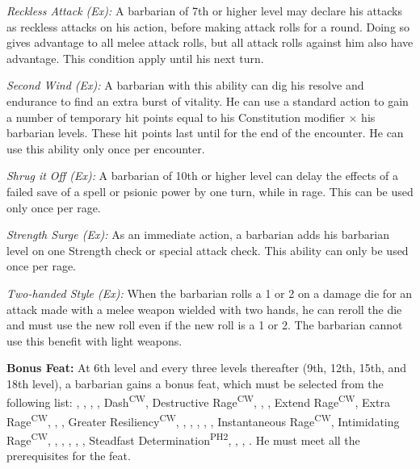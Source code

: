 \textit{Reckless Attack (Ex):} A barbarian of 7th or higher level may declare his attacks as reckless attacks on his action, before making attack rolls for a round. Doing so gives advantage to all melee attack rolls, but all attack rolls against him also have advantage. This condition apply until his next turn.

\textit{Second Wind (Ex):} A barbarian with this ability can dig his resolve and endurance to find an extra burst of vitality. He can use a standard action to gain a number of temporary hit points equal to his Constitution modifier $\times$ his barbarian levels. These hit points last until for the end of the encounter. He can use this ability only once per encounter.

\textit{Shrug it Off (Ex):} A barbarian of 10th or higher level can delay the effects of a failed save of a spell or psionic power by one turn, while in rage. This can be used only once per rage.

\textit{Strength Surge (Ex):} As an immediate action, a barbarian adds his barbarian level on one Strength check or special attack check. This ability can only be used once per rage.

\textit{Two-handed Style (Ex):} When the barbarian rolls a 1 or 2 on a damage die for an attack made with a melee weapon wielded with two hands, he can reroll the die and must use the new roll even if the new roll is a 1 or 2. The barbarian cannot use this benefit with light weapons.



\textbf{Bonus Feat:} At 6th level and every three levels thereafter (9th, 12th, 15th, and 18th level), a barbarian gains a bonus feat, which must be selected from the following list:
,
,
,
,
Dash\textsuperscript{CW},
Destructive Rage\textsuperscript{CW},
,
,
Extend Rage\textsuperscript{CW},
Extra Rage\textsuperscript{CW},
,
,
Greater Resiliency\textsuperscript{CW},
,
,
,
,
,
Instantaneous Rage\textsuperscript{CW},
Intimidating Rage\textsuperscript{CW},
,
,
,
,
,
Steadfast Determination\textsuperscript{PH2},
,
,
.
He must meet all the prerequisites for the feat.

